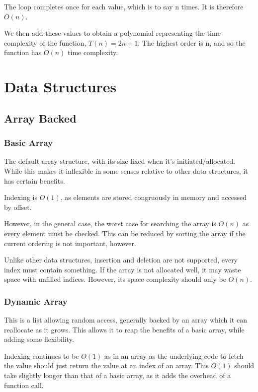 \documentclass[]{article}
\begin{document}
The loop completes once for each value, which is to say n times. It is therefore $O(n)$.

We then add these values to obtain a polynomial representing the time complexity of the function, $T(n) = 2n + 1$. The highest order is n, and so the function has $O(n)$ time complexity.

\pagebreak

\section{Data Structures}

\subsection{Array Backed}

\subsubsection{Basic Array}

The default array structure, with its size fixed when it's initiated/allocated. While this makes it inflexible in some senses relative to other data structures, it has certain benefits.

Indexing is $O(1)$, as elements are stored congruously in memory and accessed by offset.

However, in the general case, the worst case for searching the array is $O(n)$ as every element must be checked. This can be reduced by sorting the array if the current ordering is not important, however.

Unlike other data structures, insertion and deletion are not supported, every index must contain something. If the array is not allocated well, it may waste space with unfilled indices. However, its space complexity should only be $O(n)$.

\subsubsection{Dynamic Array}

This is a list allowing random access, generally backed by an array which it can reallocate as it grows. This allows it to reap the benefits of a basic array, while adding some flexibility.

Indexing continues to be $O(1)$ as in an array as the underlying code to fetch the value should just return the value at an index of an array. This $O(1)$ should take slightly longer than that of a basic array, as it adds the overhead of a function call.
\end{document}
